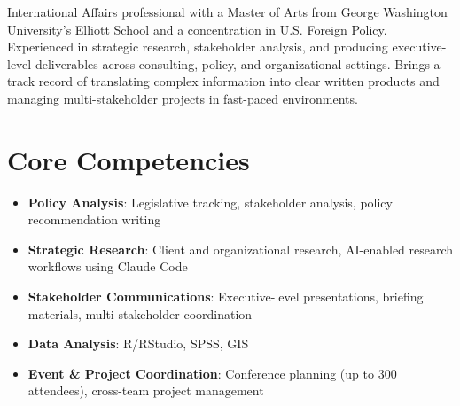 \documentclass[11pt,a4paper,sans]{moderncv}
\begin{document}
\makecvtitle


\vspace{6pt}
\small{International Affairs professional with a Master of Arts from George Washington University's Elliott School and a concentration in U.S. Foreign Policy. Experienced in strategic research, stakeholder analysis, and producing executive-level deliverables across consulting, policy, and organizational settings. Brings a track record of translating complex information into clear written products and managing multi-stakeholder projects in fast-paced environments.}


\section{Core Competencies}
\vspace{1pt}
\begin{itemize}

\item \textbf{Policy Analysis}: Legislative tracking, stakeholder analysis, policy recommendation writing

\item \textbf{Strategic Research}: Client and organizational research, AI-enabled research workflows using Claude Code

\item \textbf{Stakeholder Communications}: Executive-level presentations, briefing materials, multi-stakeholder coordination

\item \textbf{Data Analysis}: R/RStudio, SPSS, GIS

\item \textbf{Event \& Project Coordination}: Conference planning (up to 300 attendees), cross-team project management

\end{itemize}

\end{document}
